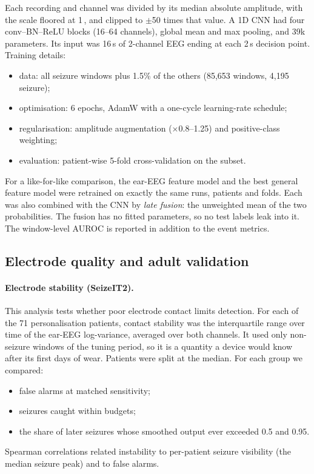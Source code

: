 Each recording and channel was divided by its median absolute amplitude, with the scale floored at 1\,\uV, and clipped to $\pm$50 times that value. A 1D CNN \cite{paszke2019} had four conv--BN--ReLU blocks (16--64 channels), global mean and max pooling, and 39k parameters. Its input was 16\,s of 2-channel EEG ending at each 2\,s decision point. Training details:
\begin{itemize}
\item data: all seizure windows plus 1.5\% of the others (85,653 windows, 4,195 seizure);
\item optimisation: 6 epochs, AdamW with a one-cycle learning-rate schedule;
\item regularisation: amplitude augmentation ($\times$0.8--1.25) and positive-class weighting;
\item evaluation: patient-wise 5-fold cross-validation on the subset.
\end{itemize}

For a like-for-like comparison, the ear-EEG feature model and the best general feature model were retrained on exactly the same runs, patients and folds. Each was also combined with the CNN by \emph{late fusion}: the unweighted mean of the two probabilities. The fusion has no fitted parameters, so no test labels leak into it. The window-level AUROC is reported in addition to the event metrics.

\subsection{Electrode quality and adult validation}
\label{sec:m-electrodes}

\paragraph{Electrode stability (SeizeIT2).} This analysis tests whether poor electrode contact limits detection. For each of the 71 personalisation patients, contact stability was the interquartile range over time of the ear-EEG log-variance, averaged over both channels. It used only non-seizure windows of the tuning period, so it is a quantity a device would know after its first days of wear. Patients were split at the median. For each group we compared:
\begin{itemize}
\item false alarms at matched sensitivity;
\item seizures caught within budgets;
\item the share of later seizures whose smoothed output ever exceeded 0.5 and 0.95.
\end{itemize}
Spearman correlations related instability to per-patient seizure visibility (the median seizure peak) and to false alarms.

